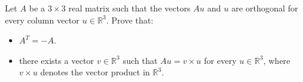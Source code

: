 Let \(A\) be a \(3\times 3\) real matrix such that the vectors \(Au\) and \(u\) are orthogonal for
every column vector \(u\in \mathbb{R}^{3}\). Prove that:\begin{itemize}

\item[(a)] \(A^{T}=-A\).
\item[(b)] there exists a vector \(v \in \mathbb{R}^{3}\) such that \(Au=v\times u\) for every \(u\in \mathbb{R}^{3}\),
where \(v \times u\) denotes the vector product in \(\mathbb{R}^{3}\).
\end{itemize}
